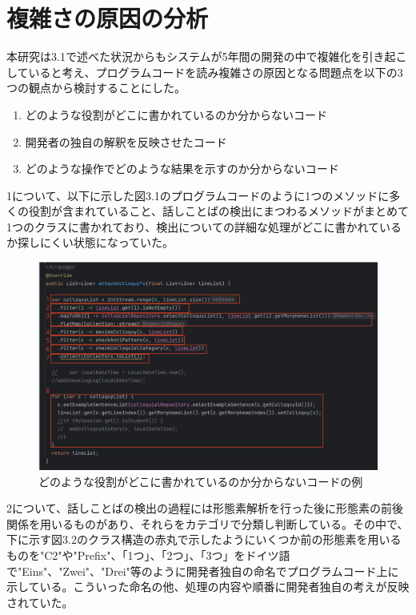 \documentclass[12pt, a4paper]{jreport}
\begin{document}
\section{複雑さの原因の分析}
本研究は3.1で述べた状況からもシステムが5年間の開発の中で複雑化を引き起こしていると考え、プログラムコードを読み複雑さの原因となる問題点を以下の3つの観点から検討することにした。
\begin{enumerate}
\item どのような役割がどこに書かれているのか分からないコード
\item 開発者の独自の解釈を反映させたコード
\item どのような操作でどのような結果を示すのか分からないコード
\end{enumerate}
1について、以下に示した図3.1のプログラムコードのように1つのメソッドに多くの役割が含まれていること、話しことばの検出にまつわるメソッドがまとめて1つのクラスに書かれており、検出についての詳細な処理がどこに書かれているか探しにくい状態になっていた。
\begin{figure}[H]
\centering \includegraphics[width=1\linewidth]{image/genin1.1.png}
\caption{どのような役割がどこに書かれているのか分からないコードの例}
\label{fig:enter-label}
\end{figure}
2について、話しことばの検出の過程には形態素解析を行った後に形態素の前後関係を用いるものがあり、それらをカテゴリで分類し判断している。その中で、下に示す図3.2のクラス構造の赤丸で示したようにいくつか前の形態素を用いるものを"C2"や"Prefix"、「1つ」、「2つ」、「3つ」をドイツ語で"Eins"、"Zwei"、"Drei"等のように開発者独自の命名でプログラムコード上に示している。こういった命名の他、処理の内容や順番に開発者独自の考えが反映されていた。
\end{document}
